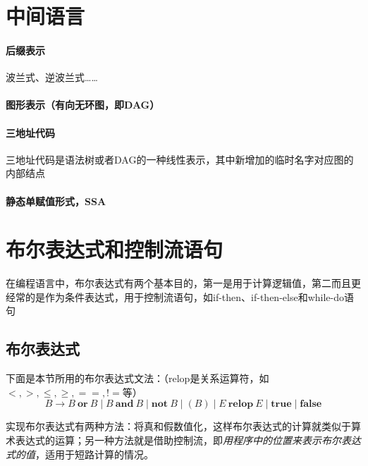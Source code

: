 \documentclass[]{report}
\begin{document}
	\section{中间语言}
		\paragraph{后缀表示}
		波兰式、逆波兰式……
		\paragraph{图形表示（有向无环图，即DAG）}
		\paragraph{三地址代码}
		三地址代码是语法树或者DAG的一种线性表示，其中新增加的临时名字对应图的内部结点
		\paragraph{静态单赋值形式，SSA}
	\section{布尔表达式和控制流语句}
		在编程语言中，布尔表达式有两个基本目的，第一是用于计算逻辑值，第二而且更经常的是作为条件表达式，用于控制流语句，如if-then、if-then-else和while-do语句
		\subsection{布尔表达式}
			下面是本节所用的布尔表达式文法：（relop是关系运算符，如$<,>,\le,\ge,==,!=$等）
			\[B\to B\ \mathbf{or}\ B\mid B\ \mathbf{and}\ B\mid\mathbf{not}\ B\mid(B)\mid E\ \mathbf{relop}\ E\mid\mathbf{true}\mid\mathbf{false}\]\par
			实现布尔表达式有两种方法：将真和假数值化，这样布尔表达式的计算就类似于算术表达式的运算；另一种方法就是借助控制流，即\textit{用程序中的位置来表示布尔表达式的值}，适用于短路计算的情况。
\end{document}
